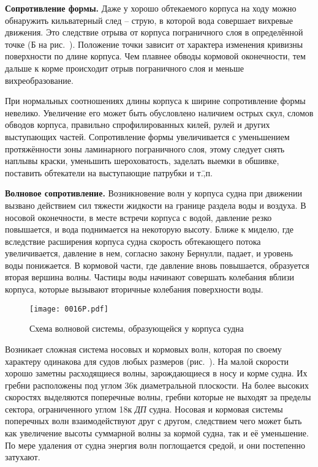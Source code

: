 \textbf{Сопротивление формы.} Даже у хорошо
обтекаемого корпуса на ходу можно обнаружить кильватерный след \---
струю, в которой вода совершает вихревые движения. Это следствие
отрыва от корпуса пограничного слоя в определённой точке (Б на
рис.~). Положение точки зависит от характера изменения
кривизны поверхности по длине корпуса. Чем плавнее обводы кормовой
оконечности, тем дальше к корме происходит отрыв пограничного слоя и
меньше вихреобразование.

При нормальных соотношениях длины корпуса к ширине сопротивление формы
невелико. Увеличение его может быть обусловлено наличием острых скул,
сломов обводов корпуса, правильно спрофилированных килей, рулей и
других выступающих частей. Сопротивление формы увеличивается с
уменьшением протяжённости зоны ламинарного пограничного слоя, этому
следует снять наплывы краски, уменьшить шероховатость, заделать выемки
в обшивке, поставить обтекатели на выступающие патрубки и т.\=,п.

\textbf{Волновое сопротивление.}
Возникновение волн у корпуса судна при движении вызвано действием сил
тяжести жидкости на границе раздела воды и воздуха. В носовой
оконечности, в месте встречи корпуса с водой, давление резко
повышается, и вода поднимается на некоторую высоту. Ближе к миделю,
где вследствие расширения корпуса судна скорость обтекающего потока
увеличивается, давление в нем, согласно закону Бернулли, падает, и
уровень воды понижается. В кормовой части, где давление вновь
повышается, образуется вторая вершина волны. Частицы воды начинают
совершать колебания вблизи корпуса, которые вызывают вторичные
колебания поверхности воды.

\begin{figure*}[htb]
  \centering
  \texttt{[image: 0016P.pdf]}
  \caption{Схема волновой системы, образующейся у корпуса судна}
  \label{fig:16}
\end{figure*}

Возникает сложная система носовых и кормовых волн, которая по своему
характеру одинакова для судов любых размеров (рис.~). На малой
скорости хорошо заметны расходящиеся волны, зарождающиеся в носу и
корме судна. Их гребни расположены под углом 36\gr к
диаметральной плоскости. На более высоких скоростях выделяются
поперечные волны, гребни которые не выходят за пределы сектора,
ограниченного углом 18\gr к \textit{ДП} судна. Носовая и
кормовая системы поперечных волн взаимодействуют друг с другом,
следствием чего может быть как увеличение высоты суммарной волны за
кормой судна, так и её уменьшение. По мере удаления от судна энергия
волн поглощается средой, и они постепенно затухают.


